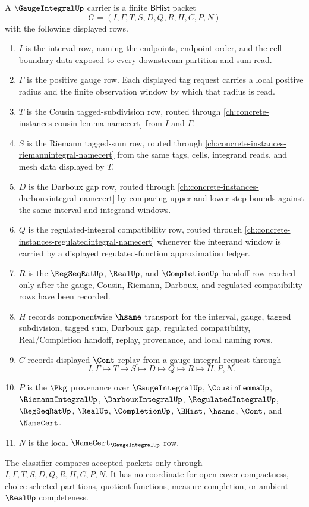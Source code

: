 \begin{definition}
\label{def:gauge-integral-carrier}
A $\GaugeIntegralUp$ carrier is a finite $\mathsf{BHist}$ packet
$$
G=(I,\Gamma,T,S,D,Q,R,H,C,P,N)
$$
with the following displayed rows.
\begin{enumerate}
\item $I$ is the interval row, naming the endpoints, endpoint order, and the cell boundary data exposed to every downstream partition and sum read.
\item $\Gamma$ is the positive gauge row. Each displayed tag request carries a local positive radius and the finite observation window by which that radius is read.
\item $T$ is the Cousin tagged-subdivision row, routed through \autoref{ch:concrete-instances-cousin-lemma-namecert} from $I$ and $\Gamma$.
\item $S$ is the Riemann tagged-sum row, routed through \autoref{ch:concrete-instances-riemannintegral-namecert} from the same tags, cells, integrand reads, and mesh data displayed by $T$.
\item $D$ is the Darboux gap row, routed through \autoref{ch:concrete-instances-darbouxintegral-namecert} by comparing upper and lower step bounds against the same interval and integrand windows.
\item $Q$ is the regulated-integral compatibility row, routed through \autoref{ch:concrete-instances-regulatedintegral-namecert} whenever the integrand window is carried by a displayed regulated-function approximation ledger.
\item $R$ is the $\RegSeqRatUp$, $\RealUp$, and $\CompletionUp$ handoff row reached only after the gauge, Cousin, Riemann, Darboux, and regulated-compatibility rows have been recorded.
\item $H$ records componentwise $\hsame$ transport for the interval, gauge, tagged subdivision, tagged sum, Darboux gap, regulated compatibility, Real/Completion handoff, replay, provenance, and local naming rows.
\item $C$ records displayed $\Cont$ replay from a gauge-integral request through
$$
I,\Gamma \longmapsto T \longmapsto S \longmapsto D \longmapsto Q \longmapsto R \longmapsto H,P,N .
$$
\item $P$ is the $\Pkg$ provenance over $\GaugeIntegralUp$, $\CousinLemmaUp$, $\RiemannIntegralUp$, $\DarbouxIntegralUp$, $\RegulatedIntegralUp$, $\RegSeqRatUp$, $\RealUp$, $\CompletionUp$, $\BHist$, $\hsame$, $\Cont$, and $\NameCert$.
\item $N$ is the local $\NameCert_{\GaugeIntegralUp}$ row.
\end{enumerate}
The classifier compares accepted packets only through $I,\Gamma,T,S,D,Q,R,H,C,P,N$. It has no coordinate for open-cover compactness, choice-selected partitions, quotient functions, measure completion, or ambient $\RealUp$ completeness.
\end{definition}

